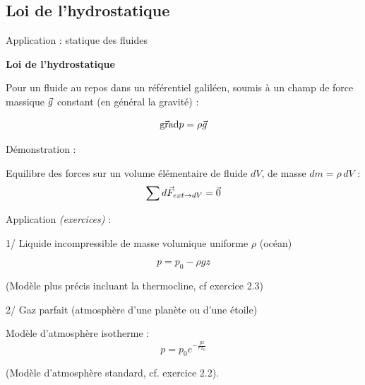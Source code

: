 \subsection{Loi de l'hydrostatique}

\begin{frame}{Application : statique des fluides}

\small
\textbf{Loi de l'hydrostatique} \medskip

Pour un fluide au repos dans un référentiel galiléen, soumis à un champ de force massique $\vec{g}$ constant (en général la gravité) :

$$
	\vec{\mbox{\rm gra}}\mbox{\rm d} p = \rho \vec{g}
$$

\pause 
Démonstration :

Equilibre des forces sur un volume élémentaire de fluide $dV$, de masse $dm = \rho\, dV$ :
$$
\sum d\vec{F}_{ext \rightarrow dV} = \vec{0}
$$


\bigskip
\pause

Application \textcolor{vert}{\sl (exercices)} : 

\smallskip

1/ Liquide incompressible de masse volumique uniforme $\rho$ (océan) 

$$
 p = p_0 - \rho g z
$$

(Modèle plus précis incluant la thermocline, cf exercice 2.3)



\bigskip

2/ Gaz parfait (atmosphère d'une planète ou d'une étoile)

Modèle d'atmosphère isotherme :
$$ 
p = p_0 e^{-\frac{ g z}{rT_0}}
$$




(Modèle d'atmosphère standard, cf. exercice 2.2).

\end{frame}




